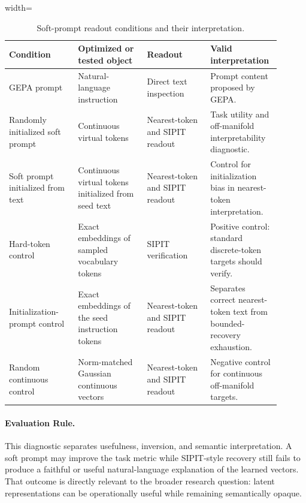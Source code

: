 \documentclass[12pt,a4paper,twoside,openright]{book}
\begin{document}
\begin{table}[!htb]
    \centering
    \scriptsize
    \begin{adjustbox}{width=\textwidth}
    \begin{tabular}{p{0.24\linewidth} p{0.24\linewidth} p{0.22\linewidth} p{0.20\linewidth}}
        \toprule
        \textbf{Condition} & \textbf{Optimized or tested object} & \textbf{Readout} & \textbf{Valid interpretation} \\
        \midrule
        GEPA prompt &
        Natural-language instruction &
        Direct text inspection &
        Prompt content proposed by GEPA. \\
        Randomly initialized soft prompt &
        Continuous virtual tokens &
        Nearest-token and SIPIT readout &
        Task utility and off-manifold interpretability diagnostic. \\
        Soft prompt initialized from text &
        Continuous virtual tokens initialized from seed text &
        Nearest-token and SIPIT readout &
        Control for initialization bias in nearest-token interpretation. \\
        Hard-token control &
        Exact embeddings of sampled vocabulary tokens &
        SIPIT verification &
        Positive control: standard discrete-token targets should verify. \\
        Initialization-prompt control &
        Exact embeddings of the seed instruction tokens &
        Nearest-token and SIPIT readout &
        Separates correct nearest-token text from bounded-recovery exhaustion. \\
        Random continuous control &
        Norm-matched Gaussian continuous vectors &
        Nearest-token and SIPIT readout &
        Negative control for continuous off-manifold targets. \\
        \bottomrule
    \end{tabular}
    \end{adjustbox}
    \caption{Soft-prompt readout conditions and their interpretation.}
    \label{tab:soft-prompt-readout}
\end{table}

\paragraph{Evaluation Rule.}
\label{subsec:method-soft-prompt-interpretation}

This diagnostic separates usefulness, inversion, and semantic interpretation. A
soft prompt may improve the task metric while SIPIT-style recovery still fails
to produce a faithful or useful natural-language explanation of the learned
vectors. That outcome is directly relevant to the broader research question:
latent representations can be operationally useful while remaining semantically
opaque.
\end{document}
